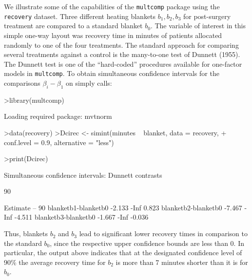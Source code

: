 \documentclass{article}
\begin{document}
We illustrate some of the capabilities of the \texttt{multcomp}
package using the \texttt{recovery} dataset. Three
different heating blankets $b_1, b_2, b_3$ for post-surgery
treatment are compared to a standard blanket $b_0$. The variable
of interest in this simple one-way layout was recovery time in
minutes of patients allocated randomly to one of the four
treatments. The standard approach for comparing several treatments
against a control is the many-to-one test of Dunnett (1955). The
Dunnett test is one of the ``hard-coded'' procedures available for
one-factor models in \texttt{multcomp}. To obtain simultaneous
confidence intervals for the comparisons $\beta_i - \beta_1$ on
simply calls:
\small
\begin{Schunk}
\begin{Sinput}
>library(multcomp)
\end{Sinput}
\begin{Soutput}
Loading required package: mvtnorm 
\end{Soutput}
\begin{Sinput}
>data(recovery)
>Dcirec <- simint(minutes ~ blanket, data = recovery, 
+     conf.level = 0.9, alternative = "less")
\end{Sinput}
\end{Schunk}
\begin{Schunk}
\begin{Sinput}
>print(Dcirec)
\end{Sinput}
\begin{Soutput}
	Simultaneous confidence intervals: Dunnett
	contrasts

	90 % confidence intervals

                    Estimate   --   90 %
blanketb1-blanketb0   -2.133 -Inf  0.823
blanketb2-blanketb0   -7.467 -Inf -4.511
blanketb3-blanketb0   -1.667 -Inf -0.036
\end{Soutput}
\end{Schunk}
\normalsize
Thus, blankets $b_2$ and $b_3$ lead to significant lower recovery
times in comparison to the standard $b_0$, since the respective
upper confidence bounds are less than 0. In particular, the output
above indicates that at the designated confidence level of 90\%
the average recovery time for $b_2$ is more than 7 minutes shorter
than it is for $b_0$.
\end{document}

